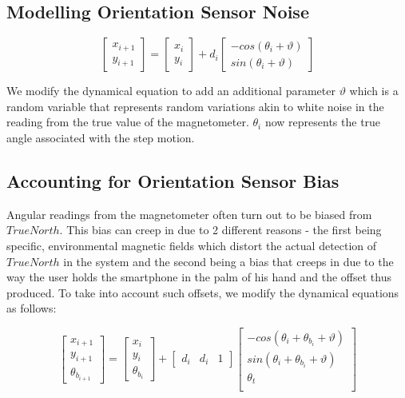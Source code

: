 \subsection{Modelling Orientation Sensor Noise}

\begin{equation}
\begin{bmatrix}x_{i+1}\\
y_{i+1}
\end{bmatrix} = \begin{bmatrix}x_{i}\\
y_{i}
\end{bmatrix}  + d{}_{i} \begin{bmatrix}-cos(\theta_{i}+\vartheta)\\
sin(\theta_{i}+\vartheta)
\end{bmatrix} 
\end{equation}

We modify the dynamical equation to add an additional parameter $\vartheta$
which is a random variable that represents random variations akin to white noise
in the reading from the true value of the magnetometer. $\theta_i$ now
represents the true angle associated with the step motion.

\subsection{Accounting for Orientation Sensor Bias\label{sec:angle_bias}}

Angular readings from the magnetometer often turn out to be biased from
$TrueNorth$. This bias can creep in due to 2 different reasons - the first being
specific, environmental magnetic fields which distort the actual detection of
$TrueNorth$ in the system and the second being a bias that creeps in due to the
way the user holds the smartphone in the palm of his hand and the offset thus
produced. To take into account such offsets, we modify the dynamical equations
as follows:

\begin{equation}
\begin{bmatrix}x_{i+1}\\
y_{i+1}\\
\theta_{b_{i+1}}
\end{bmatrix} = \begin{bmatrix}x_{i}\\
y_{i}\\
\theta_{b_i}
\end{bmatrix}  + \begin{bmatrix} d{}_{i} & d_i & 1 \end{bmatrix} \begin{bmatrix}-cos(\theta_{i}+\theta_{b_i}+\vartheta)\\
sin(\theta_{i}+\theta_{b_i}+\vartheta)\\
\theta_t\\
\end{bmatrix} 
\end{equation}

